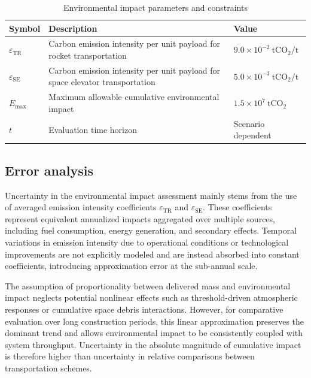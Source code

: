 \documentclass[12pt]{article}
\begin{document}
\begin{table}[htbp]
\centering
\renewcommand{\arraystretch}{1.2}
\begin{tabular}{lll}
\hline
Symbol & Description & Value \\
\hline
$\varepsilon_{\mathrm{TR}}$  & Carbon emission intensity per unit payload for rocket transportation         & $9.0 \times 10^{-2}\ \mathrm{tCO_2/t}$ \\
$\varepsilon_{\mathrm{SE}}$  & Carbon emission intensity per unit payload for space elevator transportation & $5.0 \times 10^{-3}\ \mathrm{tCO_2/t}$ \\
$E_{\max}$                   & Maximum allowable cumulative environmental impact                            & $1.5 \times 10^{7}\ \mathrm{tCO_2}$ \\
$t$                          & Evaluation time horizon                                                      & Scenario dependent \\
\hline
\end{tabular}
\caption{Environmental impact parameters and constraints}
\label{tab:environment_parameters}
\end{table}

\subsection{Error analysis}

Uncertainty in the environmental impact assessment mainly stems from the use of averaged emission intensity coefficients $\varepsilon_{\mathrm{TR}}$ and $\varepsilon_{\mathrm{SE}}$. These coefficients represent equivalent annualized impacts aggregated over multiple sources, including fuel consumption, energy generation, and secondary effects. Temporal variations in emission intensity due to operational conditions or technological improvements are not explicitly modeled and are instead absorbed into constant coefficients, introducing approximation error at the sub-annual scale.

The assumption of proportionality between delivered mass and environmental impact neglects potential nonlinear effects such as threshold-driven atmospheric responses or cumulative space debris interactions. However, for comparative evaluation over long construction periods, this linear approximation preserves the dominant trend and allows environmental impact to be consistently coupled with system throughput. Uncertainty in the absolute magnitude of cumulative impact is therefore higher than uncertainty in relative comparisons between transportation schemes.
\end{document}
